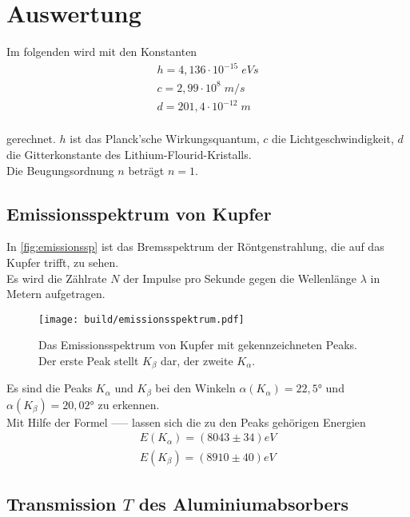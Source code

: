 \section{Auswertung}
\label{sec:Auswertung}

Im folgenden wird mit den Konstanten 
\begin{align*}
  h = 4,136 \cdot 10^{-15} \; eVs\\
  c = 2,99 \cdot 10^8 \; m/s \\
  d = 201,4 \cdot 10^{-12}\; m \\
\end{align*}

gerechnet. $h$ ist das Planck'sche Wirkungsquantum, $c$ die Lichtgeschwindigkeit,
$d$ die Gitterkonstante des Lithium-Flourid-Kristalls.\\
Die Beugungsordnung $n$ beträgt $n = 1$.




\subsection{Emissionsspektrum von Kupfer}
\label{subsec:spektrumCU}


In \autoref{fig:emissionssp} ist das Bremsspektrum der Röntgenstrahlung, die auf das Kupfer trifft, zu sehen.\\
Es wird die Zählrate $N$ der Impulse pro Sekunde gegen die Wellenlänge $\lambda$ in Metern aufgetragen.\\

\begin{figure}
  \centering
  \texttt{[image: build/emissionsspektrum.pdf]}
  \caption{Das Emissionsspektrum von Kupfer mit gekennzeichneten Peaks. Der erste Peak stellt $K_{\beta}$ dar, der zweite $K_{\alpha}$.}
  \label{fig:emissionssp}
\end{figure}

Es sind die Peaks $K_{\alpha}$ und $K_{\beta}$ bei den Winkeln $\alpha(K_{\alpha})= 22,5°$ 
und $\alpha(K_{\beta}) = 20,02°$ zu erkennen.\\

Mit Hilfe der Formel ----- lassen sich die zu den Peaks gehörigen Energien
\begin{align*}
  E(K_{\alpha}) = (8043 \pm 34) eV \\
  E(K_{\beta}) = (8910 \pm 40) eV
\end{align*}





\subsection{Transmission $T$ des Aluminiumabsorbers}
\label{subsec:transmission}

